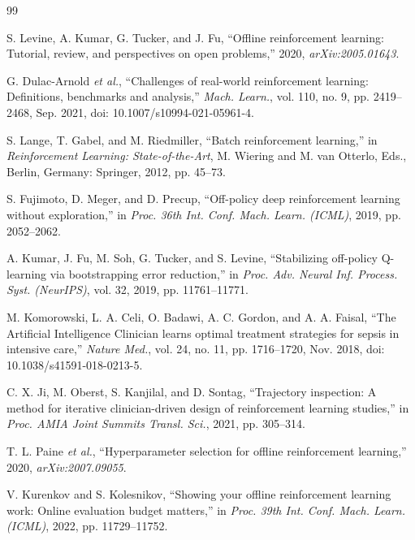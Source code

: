 \documentclass[conference]{IEEEtran}
\begin{document}
\begin{thebibliography}{99}

S. Levine, A. Kumar, G. Tucker, and J. Fu, ``Offline reinforcement learning: Tutorial, review, and perspectives on open problems,'' 2020, \emph{arXiv:2005.01643}.

G. Dulac-Arnold \emph{et al.}, ``Challenges of real-world reinforcement learning: Definitions, benchmarks and analysis,'' \emph{Mach. Learn.}, vol. 110, no. 9, pp. 2419--2468, Sep. 2021, doi: 10.1007/s10994-021-05961-4.

S. Lange, T. Gabel, and M. Riedmiller, ``Batch reinforcement learning,'' in \emph{Reinforcement Learning: State-of-the-Art}, M. Wiering and M. van Otterlo, Eds., Berlin, Germany: Springer, 2012, pp. 45--73.

S. Fujimoto, D. Meger, and D. Precup, ``Off-policy deep reinforcement learning without exploration,'' in \emph{Proc. 36th Int. Conf. Mach. Learn. (ICML)}, 2019, pp. 2052--2062.

A. Kumar, J. Fu, M. Soh, G. Tucker, and S. Levine, ``Stabilizing off-policy Q-learning via bootstrapping error reduction,'' in \emph{Proc. Adv. Neural Inf. Process. Syst. (NeurIPS)}, vol. 32, 2019, pp. 11761--11771.

M. Komorowski, L. A. Celi, O. Badawi, A. C. Gordon, and A. A. Faisal, ``The Artificial Intelligence Clinician learns optimal treatment strategies for sepsis in intensive care,'' \emph{Nature Med.}, vol. 24, no. 11, pp. 1716--1720, Nov. 2018, doi: 10.1038/s41591-018-0213-5.

C. X. Ji, M. Oberst, S. Kanjilal, and D. Sontag, ``Trajectory inspection: A method for iterative clinician-driven design of reinforcement learning studies,'' in \emph{Proc. AMIA Joint Summits Transl. Sci.}, 2021, pp. 305--314.

T. L. Paine \emph{et al.}, ``Hyperparameter selection for offline reinforcement learning,'' 2020, \emph{arXiv:2007.09055}.

V. Kurenkov and S. Kolesnikov, ``Showing your offline reinforcement learning work: Online evaluation budget matters,'' in \emph{Proc. 39th Int. Conf. Mach. Learn. (ICML)}, 2022, pp. 11729--11752.


\end{thebibliography}
\end{document}
